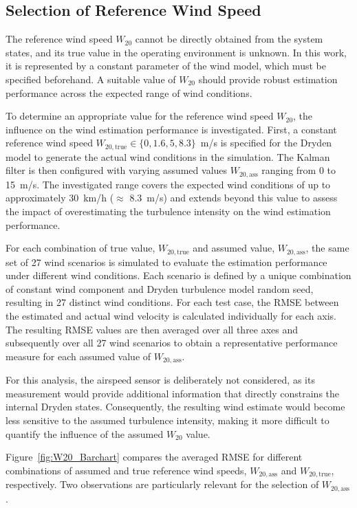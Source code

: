 \subsection{Selection of Reference Wind Speed}
\label{sec:5.1.1W20}

The reference wind speed $W_{20}$ cannot be directly obtained from the system states, and its true value in the operating environment is unknown. In this work, it is represented by a constant parameter of the wind model, which must be specified beforehand. A suitable value of $W_{20}$ should provide robust estimation performance across the expected range of wind conditions.

To determine an appropriate value for the reference wind speed $W_{20}$, the influence on the wind estimation performance is investigated. First, a constant reference wind speed $W_{20,\mathrm{true}} \in \{0, 1.6, 5,8.3\}$\SI{}{m/s} is specified for the Dryden model to generate the actual wind conditions in the simulation. The Kalman filter is then configured with varying assumed values $W_{20,\mathrm{ass}}$ ranging from $0$ to \SI{15}{m/s}. The investigated range covers the expected wind conditions of up to approximately \SI{30}{km/h} ($\approx$ \SI{8.3}{m/s}) and extends beyond this value to assess the impact of overestimating the turbulence intensity on the wind estimation performance.

For each combination of true value, $W_{20, \mathrm{true}}$ and assumed value, $W_{20,\mathrm{ass}}$, the same set of 27 wind scenarios is simulated to evaluate the estimation performance under different wind conditions. Each scenario is defined by a unique combination of constant wind component and Dryden turbulence model random seed, resulting in 27 distinct wind conditions.
For each test case, the RMSE between the estimated and actual wind velocity is calculated individually for each axis. The resulting RMSE values are then averaged over all three axes and subsequently over all 27 wind scenarios to obtain a representative performance measure for each assumed value of $W_{20,\mathrm{ass}}$.

For this analysis, the airspeed sensor is deliberately not considered, as its measurement would provide additional information that directly constrains the internal Dryden states. Consequently, the resulting wind estimate would become less sensitive to the assumed turbulence intensity, making it more difficult to quantify the influence of the assumed $W_{20}$ value.

Figure~\ref{fig:W20_Barchart} compares the averaged RMSE for different combinations of assumed and true reference wind speeds, $W_{20,\mathrm{ass}}$ and $W_{20,\mathrm{true}}$, respectively. Two observations are particularly relevant for the selection of $W_{20,\mathrm{ass}}$.

